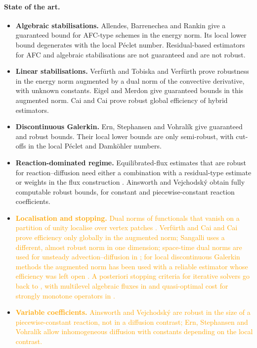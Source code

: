 \documentclass[11pt]{article}
\newcommand{\refe}[1]{\textcolor{orange}{#1}}   %
\theoremstyle{plain}
\theoremstyle{remark}
\numberwithin{equation}{section}
\begin{document}
\paragraph{State of the art.}
\begin{itemize}
  \item \textbf{Algebraic stabilisations.} Allendes, Barrenechea and Rankin \cite{ABR17} give a
  guaranteed bound for AFC-type schemes in the energy norm. Its local lower bound degenerates with
  the local P\'eclet number. Residual-based estimators for AFC and algebraic stabilisations
  \cite{J21,J24,AJ27} are not guaranteed and are not robust.
  \item \textbf{Linear stabilisations.} Verfürth \cite{V05} and Tobiska and Verfürth \cite{TV15}
  prove robustness in the energy norm augmented by a dual norm of the convective derivative, with
  unknown constants. Eigel and Merdon \cite{EM16} give guaranteed bounds in this augmented norm.
  Cai and Cai \cite{CC25} prove robust global efficiency of hybrid estimators.
  \item \textbf{Discontinuous Galerkin.} Ern, Stephansen and Vohral\'ik \cite{ESV10} give
  guaranteed and robust bounds. Their local lower bounds are only semi-robust, with cut-offs in the
  local P\'eclet and Damk\"ohler numbers.
  \item \textbf{Reaction-dominated regime.} Equilibrated-flux estimates that are robust for
  reaction--diffusion need either a combination with a residual-type estimate \cite{CFPV09} or
  weights in the flux construction \cite{SV20}. Ainsworth and Vejchodsk\'y \cite{AV11,AV14} obtain
  fully computable robust bounds, for constant and piecewise-constant reaction coefficients.
\item \refe{\textbf{Localisation and stopping.} Dual norms of functionals that vanish on a partition of unity
  localise over vertex patches \cite{BMV,CV18}. Verfürth \cite{V05} and Cai and Cai \cite{CC25} prove
  efficiency only globally in the augmented norm; Sangalli \cite{Sa08} uses a different, almost robust
  norm in one dimension; space-time dual norms are used for unsteady advection--diffusion in
  \cite{DEV13}; for local discontinuous Galerkin methods the augmented norm has been used with a reliable
  estimator whose efficiency was left open \cite{LDG20}. A posteriori stopping criteria for iterative
  solvers go back to \cite{EV13}, with multilevel algebraic fluxes in \cite{PRVW20} and quasi-optimal
  cost for strongly monotone operators in \cite{HPSV21}.}
  \item \refe{\textbf{Variable coefficients.} Ainsworth and Vejchodsk\'y \cite{AV14} are robust in the size of a
  piecewise-constant reaction, not in a diffusion contrast; Ern, Stephansen and Vohral\'ik \cite{ESV10}
  allow inhomogeneous diffusion with constants depending on the local contrast.}
\end{itemize}
\end{document}
